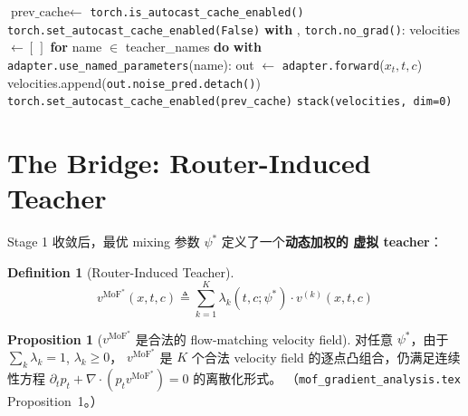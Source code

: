 \documentclass[11pt,a4paper]{article}
\newcommand{\MoF}{\mathrm{MoF}}
\theoremstyle{definition}
\newtheorem{definition}{Definition}
\newtheorem{proposition}{Proposition}
\begin{document}
\begin{algorithm}[H]
\caption{Safe Teacher Forward (autocast + DDP invariants)}
\label{alg:teacher_forward}
\begin{algorithmic}[1]
  \State $\text{prev\_cache} \gets$ \texttt{torch.is\_autocast\_cache\_enabled()}
  \State \texttt{torch.set\_autocast\_cache\_enabled(False)}
  \State \textbf{with} , \texttt{torch.no\_grad()}:
  \State \quad velocities $\gets [\,]$
  \State \quad \textbf{for} name $\in$ teacher\_names \textbf{do}
  \State \qquad \textbf{with} \texttt{adapter.use\_named\_parameters}(name):
  \State \qquad\quad out $\gets$ \texttt{adapter.forward}($x_t, t, c$)
  \State \qquad velocities.append(\texttt{out.noise\_pred.detach()})
  \State \texttt{torch.set\_autocast\_cache\_enabled(prev\_cache)}
  \State \Return \texttt{stack(velocities, dim=0)} 
\EndFunction
\end{algorithmic}
\end{algorithm}

\section{The Bridge: Router-Induced Teacher}
\label{sec:bridge}

Stage 1 收敛后，最优 mixing 参数 $\psi^*$ 定义了一个\textbf{动态加权的
虚拟 teacher}：

\begin{definition}[Router-Induced Teacher]
\label{def:router_teacher}
\begin{equation}
\boxed{
v^{\MoF^*}(x, t, c)
\triangleq \sum_{k=1}^K \lambda_k\!\left(t, c; \psi^*\right) \cdot v^{(k)}(x, t, c)
}
\label{eq:router_teacher}
\end{equation}
\end{definition}

\begin{proposition}[$v^{\MoF^*}$ 是合法的 flow-matching velocity field]
\label{prop:legal_flow}
对任意 $\psi^*$，由于 $\sum_k \lambda_k = 1$, $\lambda_k \geq 0$，
$v^{\MoF^*}$ 是 $K$ 个合法 velocity field 的逐点凸组合，仍满足连续性方程
$\partial_t p_t + \nabla\cdot(p_t v^{\MoF^*}) = 0$ 的离散化形式。
（\texttt{mof\_gradient\_analysis.tex} Proposition~1。）
\end{proposition}
\end{document}
